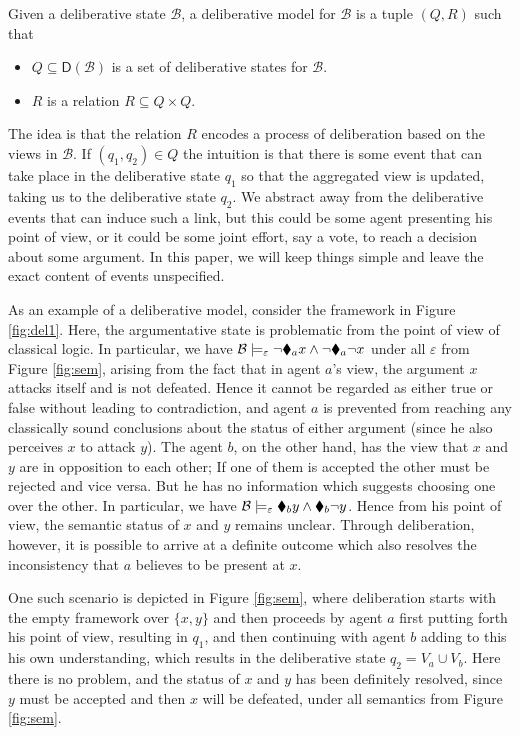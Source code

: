 \documentclass[greybox]{svmult}
\newcommand{\dstate}[1]{\mathsf D({#1}) }
\newcommand{\views}{\mathcal B}
\newcommand{\sem}{\varepsilon}
\begin{document}
\begin{definition}\label{def:dk}
Given a deliberative state $\views$, a deliberative model for $\views$ is a tuple $(Q,R)$ such that
\begin{itemize}
\item $Q \subseteq \dstate \views$ is a set of deliberative states for $\views$.
\item $R$ is a relation $R \subseteq Q \times Q$.
\end{itemize}
\end{definition}

The idea is that the relation $R$ encodes a process of deliberation based on the views in $\views$. If $(q_1,q_2) \in Q$ the intuition is that there is some event that can take place in the deliberative state $q_1$ so that the aggregated view is updated, taking us to the deliberative state $q_2$. We abstract away from the deliberative events that can induce such a link, but this could be some agent presenting his point of view, or it could be some joint effort, say a vote, to reach a decision about some argument. In this paper, we will keep things simple and leave the exact content of events unspecified.

As an example of a deliberative model, consider the framework in Figure \ref{fig:del1}. Here, the argumentative state is problematic from the point of view of classical logic. In particular, we have $\views \models_\sem \neg \cdia_a x \land \neg \cdia_a \neg x$ under all $\sem$ from Figure \ref{fig:sem}, arising from the fact that in agent $a$'s view, the argument $x$ attacks itself and is not defeated. Hence it cannot be regarded as either true or false without leading to contradiction, and agent $a$ is prevented from reaching any classically sound conclusions about the status of either argument (since he also perceives $x$ to attack $y$). The agent $b$, on the other hand, has the view that $x$ and $y$ are in opposition to each other; If one of them is accepted the other must be rejected and vice versa. But he has no information which suggests choosing one over the other. In particular, we have $\views \models_\sem \cdia_b y \land \cdia_b \neg y$. Hence from his point of view, the semantic status of $x$ and $y$ remains unclear. Through deliberation, however, it is possible to arrive at a definite outcome which also resolves the inconsistency that $a$ believes to be present at $x$. 

One such scenario is depicted in Figure \ref{fig:sem}, where deliberation starts with the empty framework over $\{x,y\}$ and then proceeds by agent $a$ first putting forth his point of view, resulting in $q_1$, and then continuing with agent $b$ adding to this his own understanding, which results in the deliberative state $q_2 = V_a \cup V_b$. Here there is no problem, and the status of $x$ and $y$ has been definitely resolved, since $y$ must be accepted and then $x$ will be defeated, under all semantics from Figure \ref{fig:sem}.
\end{document}

